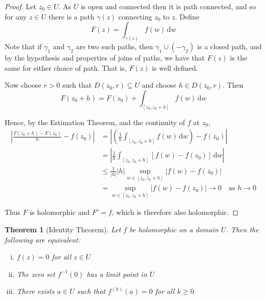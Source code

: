 \documentclass[10pt,fleqn]{article}
\newcommand{\diff}{\,\mathrm{d}}
\theoremstyle{definition} \newtheorem{defn}{Definition}[section]
\theoremstyle{plain}      \newtheorem{thm}[defn]{Theorem}
\theoremstyle{definition} \newtheorem{prop}[defn]{Proposition}
\theoremstyle{plain}      \newtheorem{lem}[defn]{Lemma}
\theoremstyle{definition} \newtheorem{cor}[defn]{Corollary}
\theoremstyle{definition} \newtheorem{ex}[defn]{Example}
\theoremstyle{definition} \newtheorem{rem}[defn]{Remark}
\begin{document}
\begin{proof}
    Let $z_0\in U$.
    As $U$ is open and connected then it is path connected, and so for any $z\in U$ there is a path $\gamma(z)$ connecting $z_0$ to $z$.
    Define
    \[
        F(z)=
        \int_{\gamma(z)} f(w)\diff w
    \]
    Note that if $\gamma_1$ and $\gamma_2$ are two such paths, then $\gamma_1\cup(-\gamma_2)$ is a closed path, and by the hypothesis and properties of joins of paths, we have that $F(z)$ is the same for either choice of path.
    That is, $F(z)$ is well defined.

    Now choose $r>0$ such that $D(z_0,r)\subseteq U$ and choose $h\in D(z_0,r)$.
    Then
    \[
        F(z_0+h)=
        F(z_0)+\int_{[z_0,z_0+h]} f(w)\diff w
    \]

    Hence, by the Estimation Theorem, and the continuity of $f$ at $z_0$,
    \begin{align*}
        \left|\frac{F(z_0+h)-F(z_0)}{h}-f(z_0)\right|
        &=
        \left|\left(\frac{1}{h}\int_{[z_0,z_0+h]} f(w)\diff w\right)-f(z_0)\right|\\
        &=
        \left|\frac{1}{h}\int_{[z_0,z_0+h]} [f(w)-f(z_0)]\diff w\right|\\
        &\leq
        \frac{1}{|h|}|h|\sup_{w\in[z_0,z_0+h]}|f(w)-f(z_0)|\\
        &=
        \sup_{w\in[z_0,z_0+h]}|f(w)-f(z_0)|\to0\quad\text{as }h\to0
    \end{align*}

    Thus $F$ is holomorphic and $F'=f$, which is therefore also holomorphic.
\end{proof}

\begin{thm}[Identity Theorem]
    Let $f$ be holomorphic on a domain $U$.
    Then the following are equivalent:
    \begin{enumerate}[(i)]
        \item $f(z)=0$ for all $z\in U$
        \item The zero set $f^{-1}(0)$ has a limit point in $U$
        \item There exists $a\in U$ such that $f^{(k)}(a)=0$ for all $k\geq 0$
    \end{enumerate}
\end{thm}
\end{document}
